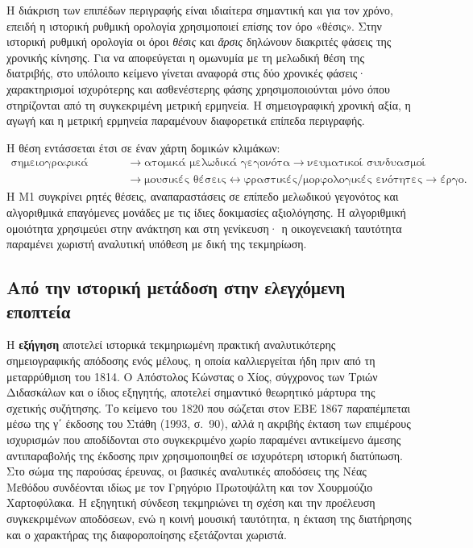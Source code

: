 \documentclass[11pt,a4paper]{article}
\begin{document}
Η διάκριση των επιπέδων περιγραφής είναι ιδιαίτερα σημαντική και για τον χρόνο, επειδή η ιστορική ρυθμική ορολογία χρησιμοποιεί επίσης τον όρο «θέσις». Στην ιστορική ρυθμική ορολογία οι όροι \emph{θέσις} και \emph{ἄρσις} δηλώνουν διακριτές φάσεις της χρονικής κίνησης. Για να αποφεύγεται η ομωνυμία με τη μελωδική θέση της διατριβής, στο υπόλοιπο κείμενο γίνεται αναφορά στις δύο χρονικές φάσεις· χαρακτηρισμοί ισχυρότερης και ασθενέστερης φάσης χρησιμοποιούνται μόνο όπου στηρίζονται από τη συγκεκριμένη μετρική ερμηνεία. Η σημειογραφική χρονική αξία, η αγωγή και η μετρική ερμηνεία παραμένουν διαφορετικά επίπεδα περιγραφής.

Η θέση εντάσσεται έτσι σε έναν χάρτη δομικών κλιμάκων:
\[
\begin{aligned}
\text{σημειογραφικά στοιχεία}
&\rightarrow \text{ατομικά μελωδικά γεγονότα}
\rightarrow \text{νευματικοί συνδυασμοί}\\[0.25em]
&\rightarrow \boxed{\text{μουσικές θέσεις}}
\leftrightarrow \text{φραστικές/μορφολογικές ενότητες}
\rightarrow \text{έργο}.
\end{aligned}
\]
Η M1 συγκρίνει ρητές θέσεις, αναπαραστάσεις σε επίπεδο μελωδικού γεγονότος και αλγοριθμικά επαγόμενες μονάδες με τις ίδιες δοκιμασίες αξιολόγησης. Η αλγοριθμική ομοιότητα χρησιμεύει στην ανάκτηση και στη γενίκευση· η οικογενειακή ταυτότητα παραμένει χωριστή αναλυτική υπόθεση με δική της τεκμηρίωση.

\subsection{Από την ιστορική μετάδοση στην ελεγχόμενη εποπτεία}

Η \textbf{εξήγηση} αποτελεί ιστορικά τεκμηριωμένη πρακτική αναλυτικότερης σημειογραφικής απόδοσης ενός μέλους, η οποία καλλιεργείται ήδη πριν από τη μεταρρύθμιση του 1814. Ο Απόστολος Κώνστας ο Χίος, σύγχρονος των Τριών Διδασκάλων και ο ίδιος εξηγητής, αποτελεί σημαντικό θεωρητικό μάρτυρα της σχετικής συζήτησης. Το κείμενο του 1820 που σώζεται στον ΕΒΕ 1867 παραπέμπεται μέσω της γ΄ έκδοσης του Στάθη (1993, σ.~90), αλλά η ακριβής έκταση των επιμέρους ισχυρισμών που αποδίδονται στο συγκεκριμένο χωρίο παραμένει αντικείμενο άμεσης αντιπαραβολής της έκδοσης πριν χρησιμοποιηθεί σε ισχυρότερη ιστορική διατύπωση. Στο σώμα της παρούσας έρευνας, οι βασικές αναλυτικές αποδόσεις της Νέας Μεθόδου συνδέονται ιδίως με τον Γρηγόριο Πρωτοψάλτη και τον Χουρμούζιο Χαρτοφύλακα. Η εξηγητική σύνδεση τεκμηριώνει τη σχέση και την προέλευση συγκεκριμένων αποδόσεων, ενώ η κοινή μουσική ταυτότητα, η έκταση της διατήρησης και ο χαρακτήρας της διαφοροποίησης εξετάζονται χωριστά.
\end{document}
